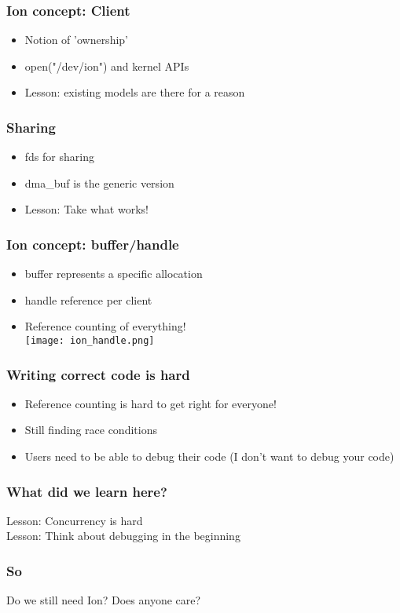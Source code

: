 \documentclass{beamer}
\begin{document}
\begin{frame}
\frametitle{Ion concept: Client}
\begin{itemize}
\item Notion of 'ownership'
\item open("/dev/ion") and kernel APIs
\item Lesson: existing models are there for a reason
\end{itemize}
\end{frame}

\begin{frame}
\frametitle{Sharing}
\begin{itemize}
\item fds for sharing
\item dma\_buf is the generic version
\item Lesson: Take what works!
\end{itemize}
\end{frame}

\begin{frame}
\frametitle{Ion concept: buffer/handle}
\begin{itemize}
\item buffer represents a specific allocation
\item handle reference per client
\item Reference counting of everything! \\
\texttt{[image: ion\_handle.png]}
\end{itemize}
\end{frame}

\begin{frame}
\frametitle{Writing correct code is hard}
\begin{itemize}
\item Reference counting is hard to get right for everyone!
\item Still finding race conditions
\item Users need to be able to debug their code (I don't want to debug your code)
\end{itemize}
\end{frame}

\begin{frame}
\frametitle{What did we learn here?}
Lesson: Concurrency is hard \\
Lesson: Think about debugging in the beginning
\end{frame}

\begin{frame}
\frametitle{So}
Do we still need Ion? Does anyone care?
\end{frame}
\end{document}
